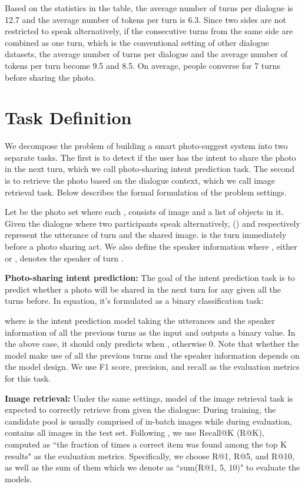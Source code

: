 \documentclass[11pt,a4paper]{article}
\begin{document}
Based on the statistics in the table, the average number of turns per dialogue is 12.7 and the average number of tokens per turn is 6.3. Since two sides are not restricted to speak alternatively, if the consecutive turns from the same side are combined as one turn, which is the conventional setting of other dialogue datasets, the average number of turns per dialogue and the average number of tokens per turn become 9.5 and 8.5. On average, people converse for 7 turns before sharing the photo. 

\section{Task Definition}
We decompose the problem of building a smart photo-suggest system into two separate tasks. The first is to detect if the user has the intent to share the photo in the next turn, which we call photo-sharing intent prediction task. The second is to retrieve the photo based on the dialogue context, which we call image retrieval task. 
Below describes the formal formulation of the problem settings.

Let  be the photo set where each ,  consists of image  and a list of objects  in it. Given the dialogue  where two participants speak alternatively,  () and  respectively represent the utterance of turn  and the shared image.  is the turn immediately before a photo sharing act. We also define the speaker information  where  , either  or , denotes the speaker of turn . 

\textbf{Photo-sharing intent prediction:} The goal of the intent prediction task is to predict whether a photo will be shared in the next turn for any  given all the turns before. In equation, it's formulated as a binary classification task:

where  is the intent prediction model taking the utterances and the speaker information of all the previous turns as the input and outputs a binary value. In the above case, it should only predicts  when , otherwise 0. Note that whether the model make use of all the previous turns and the speaker information depends on the model design. We use F1 score, precision, and recall as the evaluation metrics for this task.

\textbf{Image retrieval:} Under the same settings, model  of the image retrieval task is expected to correctly retrieve  from  given the dialogue:
During training, the candidate pool  is usually comprised of in-batch images while 
during evaluation,  contains all images in the test set. Following \citet{karpathy2015deep}, we use Recall@K (R@K), computed as ``the fraction of times a correct item was found among the top K results" as the evaluation metrics. Specifically, we choose R@1, R@5, and R@10, as well as the sum of them which we denote as ``sum(R@1, 5, 10)" to evaluate the models.
\end{document}
